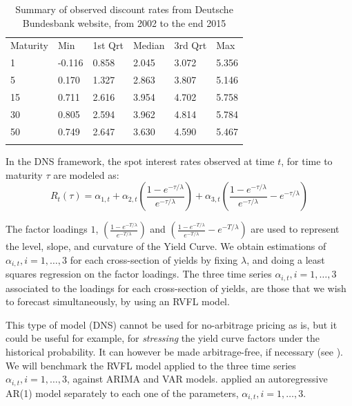 \begin{table}
\begin{center}
\caption{Summary of observed discount rates from Deutsche Bundesbank website, from 2002 to the end 2015}
\label{tab:summary_db_zeros}       %
\begin{tabular}{llllll}
\hline\noalign{\smallskip}
Maturity & Min & 1st Qrt  & Median  & 3rd Qrt  & Max  \\
\noalign{\smallskip}\hline\noalign{\smallskip}
  1 & -0.116 & 0.858 & 2.045 & 3.072 & 5.356 \\
  5 & 0.170 & 1.327 & 2.863 & 3.807 & 5.146\\
  15 & 0.711 & 2.616 & 3.954 & 4.702 & 5.758\\
  30 & 0.805 & 2.594 & 3.962 & 4.814 & 5.784\\
  50 & 0.749 & 2.647 & 3.630 & 4.590 & 5.467\\
\noalign{\smallskip}\hline
\end{tabular}
\end{center}
\end{table}

In the DNS framework, the spot interest rates observed at time $t$, for time to maturity $\tau$ are modeled as:
\begin{equation}
R_t(\tau) = \alpha_{1, t} + \alpha_{2, t}\left(\frac{1-e^{-\tau/\lambda}}{e^{-\tau/\lambda}}\right) + \alpha_{3, t}\left(\frac{1-e^{-\tau/\lambda}}{e^{-\tau/\lambda}} - e^{-\tau/\lambda}\right)
\end{equation}

\medskip

The factor loadings $1$, $\left(\frac{1-e^{-T/\lambda}}{e^{-T/\lambda}}\right)$ and $\left(\frac{1-e^{-T/\lambda}}{e^{-T/\lambda}} - e^{-T/\lambda}\right)$ are used to represent the level, slope, and curvature of the Yield Curve. We obtain estimations of $\alpha_{i, t}, i = 1, \ldots, 3$ for each cross-section of yields by fixing $\lambda$, and doing a least squares regression on the factor loadings. The three time series $\alpha_{i, t}, i = 1, \ldots, 3$ associated to the loadings for each cross-section of yields, are those that we wish to forecast simultaneously, by using an RVFL model.

\medskip

This type of model (DNS) cannot be used for no-arbitrage pricing as is, but it could be useful for example, for \textit{stressing} the yield curve factors under the historical probability. It can however be made arbitrage-free, if necessary (see \cite{diebold2013yield}). We will benchmark the RVFL model applied to the three time series $\alpha_{i, t}, i = 1, \ldots, 3$, against ARIMA and VAR models. \cite{diebold2006forecasting} applied an autoregressive AR(1) model separately to each one of the parameters, $\alpha_{i, t}, i = 1, \ldots, 3$.

